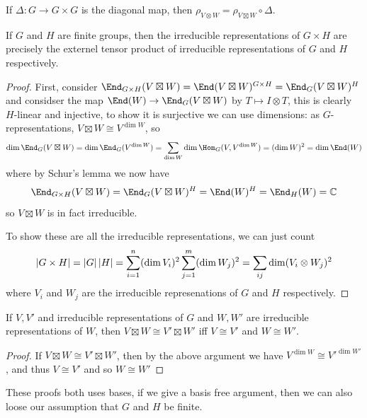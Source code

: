 \documentclass{article}
\begin{document}
If $\Delta:G\rightarrow G\times G$ is the diagonal map, then $\rho_{V\otimes W} = \rho_{V\boxtimes W}\circ \Delta$.

\begin{proposition}
    If $G$ and $H$ are finite groups, then the irreducible representations of $G\times H$ are precisely the externel tensor product of irreducible representations of $G$ and $H$ respectively.
    \begin{proof}
        First, consider $\End_{G\times H}(V\boxtimes W) = \End(V\boxtimes W)^{G\times H} = \End_G(V\boxtimes W)^H$ and considser the map $\End(W)\rightarrow \End_G(V\boxtimes W)$ by $T\mapsto I\otimes T$, this is clearly $H$-linear and injective, to show it is surjective we can use dimensions: as $G$-representations, $V\boxtimes W \cong V^{\dim W}$, so \[
        \dim\End_G(V\boxtimes W) = \dim\End_G(V^{\dim W}) = \sum_{\dim W}\dim\Hom_G(V,V^{\dim W}) = (\dim W)^2 = \dim\End(W)
        \] where by Schur's lemma we now have \[
        \End_{G\times H}(V\boxtimes W) = \End_G(V\boxtimes W)^H = \End(W)^H = \End_H(W) = \bC
        \] so $V\boxtimes W$ is in fact irreducible.

        To show these are all the irreducible representations, we can just count \[
        \left| G\times H \right| = \left| G \right|\left| H \right| = \sum_{i=1}^n(\dim V_i)^2\sum_{j=1}^m(\dim W_j)^2 = \sum_{ij}\dim(V_i\otimes W_j)^2
        \] where $V_i$ and $W_j$ are the irreducible represenations of $G$ and $H$ respectively.
    \end{proof}
\end{proposition}

\begin{proposition}
    If $V,V'$ and irreducible representations of $G$ and $W,W'$ are irreducible representations of $W$, then $V\boxtimes W \cong V'\boxtimes W'$ iff $V\cong V'$ and $W\cong W'$.\begin{proof}
        If $V\boxtimes W\cong V'\boxtimes W'$, then by the above argument we have $V^{\dim W}\cong V'^{\dim W'}$, and thus $V\cong V'$ and so $W\cong W'$
    \end{proof}
\end{proposition}

These proofs both uses bases, if we give a basis free argument, then we can also loose our assumption that $G$ and $H$ be finite.
\end{document}
